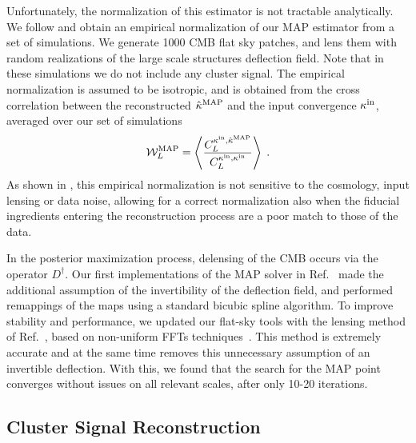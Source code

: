 \documentclass[prd, superscriptaddress, tightenlines, longbibliography, nofootinbib, eqsecnum, amsfonts, amsmath, floatfix, twocolumn, notitlepage]{revtex4-2}
\begin{document}
Unfortunately, the normalization of this estimator is not tractable analytically. We follow \cite{Legrand:2021qdu,Legrand:2023jne} and obtain an empirical normalization of our MAP estimator from a set of simulations.
We generate 1000 CMB flat sky patches, and lens them with random realizations of the large scale structures deflection field. Note that in these simulations we do not include any cluster signal. The empirical normalization is assumed to be isotropic, and is obtained from the cross correlation between the reconstructed $\hat \kappa^{\rm MAP}$ and the input convergence $\kappa^{\rm in}$, averaged over our set of simulations
\begin{equation}
    \mathcal{W}^{\rm MAP}_L = \left< \frac{C_L^{\kappa^{\rm in}, \hat \kappa^{\rm MAP}}}{C_L^{\kappa^{\rm in}, \kappa^{\rm in}}} \right> \; .
\end{equation}
As shown in \cite{Legrand:2021qdu,Legrand:2023jne}, this empirical normalization is not sensitive to the cosmology, input lensing or data noise, allowing for a correct normalization also when the fiducial ingredients entering the reconstruction process are a poor match to those of the data.


In the posterior maximization process, delensing of the CMB occurs via the operator $D^\dagger$. Our first implementations of the MAP solver in Ref.~\cite{Carron:2017mqf} made the additional assumption of the invertibility of the deflection field, and performed remappings of the maps using a standard bicubic spline algorithm. To improve stability and performance, we updated our flat-sky tools with the lensing method of Ref.~\cite{Reinecke:2023gtp}, based on non-uniform FFTs techniques~\cite{Barnett2019, Barnett2020}. This method is extremely accurate and at the same time removes this unnecessary assumption of an invertible deflection. With this, we found that the search for the MAP point converges without issues on all relevant scales, after only 10-20 iterations.


\subsection{Cluster Signal Reconstruction}
\label{sec:cluster_mass}
\end{document}
